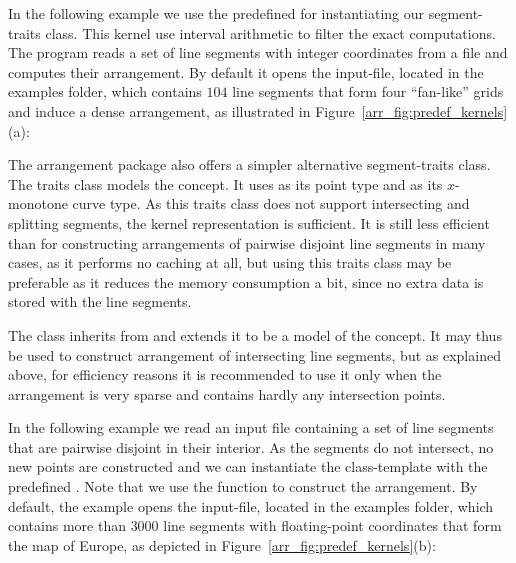 In the following example we use the predefined
 for instantiating our
segment-traits class. This kernel use interval arithmetic to filter the
exact computations. The program reads a set of line segments with integer
coordinates from a file and computes their arrangement. By default it
opens the  input-file, located in the examples folder,
which contains $104$ line segments that form four ``fan-like'' grids and
induce a dense arrangement, as illustrated in
Figure~\ref{arr_fig:predef_kernels}(a):


The arrangement package also offers a simpler alternative
segment-traits class. The traits class
 models 
the  concept. It uses
 as its point type and
 as its $x$-monotone curve type. As this
traits class does not support intersecting and splitting segments,
the kernel representation is sufficient. It is still less
efficient than  for constructing
arrangements of pairwise disjoint line segments in many cases, as
it performs no caching at all, but using this traits class may be
preferable as it reduces the memory consumption a bit, since no extra
data is stored with the line segments.

The class  inherits
from  and
extends it to be a model of the  concept.
It may thus be used to construct arrangement of intersecting line
segments, but as explained above, for efficiency reasons it is
recommended to use it only when the arrangement is very sparse and
contains hardly any intersection points.

In the following example we read an input file containing a set of
line segments that are pairwise disjoint in their interior. As the
segments do not intersect, no new points are constructed and we can
instantiate the 
class-template with the predefined
. Note that we use
the  function to construct the
arrangement.
By default, the example opens the  input-file,
located in the examples folder, which contains more than $3000$ line segments
with floating-point coordinates that form the map of Europe, as depicted in
Figure~\ref{arr_fig:predef_kernels}(b):

